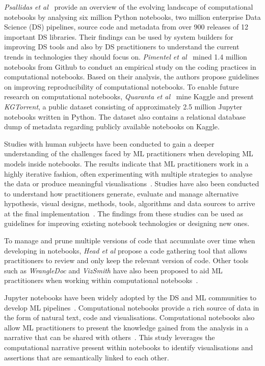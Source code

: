 \emph{Psallidas et al}~\cite{psallidas2019data} provide an overview of the evolving landscape of computational notebooks by analysing six million Python notebooks, two million enterprise Data Science (DS) pipelines, source code and metadata from over 900 releases of 12 important DS libraries. Their findings can be used by system builders for improving DS tools and also by DS practitioners to understand the current trends in technologies they should focus on. \emph{Pimentel et al}~\cite{pimentel2019large-scale} mined 1.4 million notebooks from Github to conduct an empirical study on the coding practices in computational notebooks. Based on their analysis, the authors propose guidelines on improving reproducibility of computational notebooks. To enable future research on computational notebooks, \emph{Quaranta et al}~\cite{quaranta2021kgtorrent} mine Kaggle and present \textit{KGTorrent}, a public dataset consisting of approximately 2.5 million Jupyter notebooks written in Python. The dataset also contains a relational database dump of metadata regarding publicly available notebooks on Kaggle.

Studies with human subjects have been conducted to gain a deeper understanding of the challenges faced by ML practitioners when developing ML models inside notebooks. The results indicate that ML practitioners work in a highly iterative fashion, often experimenting with multiple strategies to analyse the data or produce meaningful visualisations~\cite{kandel2012enterprise,kery2018story,liu2019understanding,chattopadhyay2020whats}. Studies have also been conducted to understand how practitioners generate, evaluate and manage alternative hypothesis, visual designs, methods, tools, algorithms and data sources to arrive at the final implementation~\cite{liu2019understanding,kandel2012enterprise}. The findings from these studies can be used as guidelines for improving existing notebook technologies or designing new ones.

To manage and prune multiple versions of code that accumulate over time when developing in notebooks, \emph{Head et al} propose a code gathering tool that allows practitioners to review and only keep the relevant version of code. Other tools such as \textit{WrangleDoc} and \textit{VizSmith} have also been proposed to aid ML practitioners when working within computational notebooks~\cite{yang2021subtle,bavishi2021vizsmith}.

Jupyter notebooks have been widely adopted by the DS and ML communities to develop ML pipelines~\cite{wang2020assessing,pimentel2019large-scale,quaranta2021kgtorrent}. Computational notebooks provide a rich source of data in the form of natural text, code and visualisations. Computational notebooks also allow ML practitioners to present the knowledge gained from the analysis in a narrative that can be shared with others~\cite{rule2018exploration}. This study leverages the computational narrative present within notebooks to identify visualisations and assertions that are semantically linked to each other.

